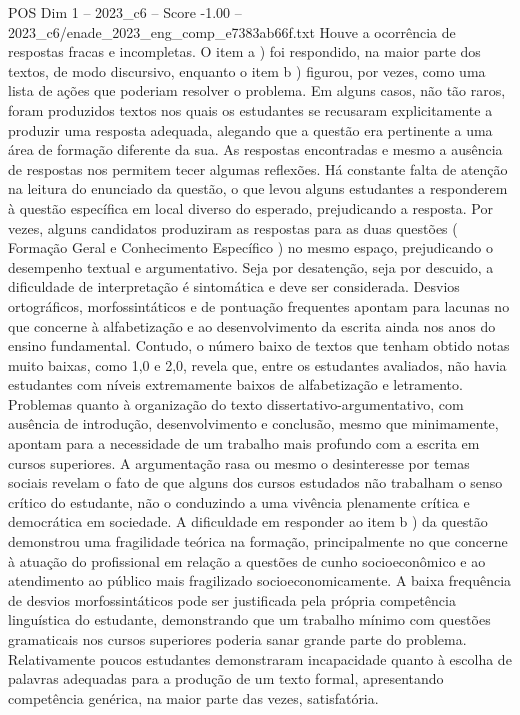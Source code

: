 \begin{textsample}{POS Dim 1 – 2023\_c6 – Score -1.00 – 2023\_c6/enade\_2023\_eng\_comp\_e7383ab66f.txt}
Houve a ocorrência de respostas fracas e incompletas.
O item a ) foi respondido, na maior parte dos textos, de modo discursivo, enquanto o item b ) figurou, por vezes, como uma lista de ações que poderiam resolver o problema.
Em alguns casos, não tão raros, foram produzidos textos nos quais os estudantes se recusaram explicitamente a produzir uma resposta adequada, alegando que a questão era pertinente a uma área de formação diferente da sua.
As respostas encontradas e mesmo a ausência de respostas nos permitem tecer algumas reflexões.
Há constante falta de atenção na leitura do enunciado da questão, o que levou alguns estudantes a responderem à questão específica em local diverso do esperado, prejudicando a resposta.
Por vezes, alguns candidatos produziram as respostas para as duas questões ( Formação Geral e Conhecimento Específico ) no mesmo espaço, prejudicando o desempenho textual e argumentativo.
Seja por desatenção, seja por descuido, a dificuldade de interpretação é sintomática e deve ser considerada.
Desvios ortográficos, morfossintáticos e de pontuação frequentes apontam para lacunas no que concerne à alfabetização e ao desenvolvimento da escrita ainda nos anos do ensino fundamental.
Contudo, o número baixo de textos que tenham obtido notas muito baixas, como 1,0 e 2,0, revela que, entre os estudantes avaliados, não havia estudantes com níveis extremamente baixos de alfabetização e letramento.
Problemas quanto à organização do texto dissertativo-argumentativo, com ausência de introdução, desenvolvimento e conclusão, mesmo que minimamente, apontam para a necessidade de um trabalho mais profundo com a escrita em cursos superiores.
A argumentação rasa ou mesmo o desinteresse por temas sociais revelam o fato de que alguns dos cursos estudados não trabalham o senso crítico do estudante, não o conduzindo a uma vivência plenamente crítica e democrática em sociedade.
A dificuldade em responder ao item b ) da questão demonstrou uma fragilidade teórica na formação, principalmente no que concerne à atuação do profissional em relação a questões de cunho socioeconômico e ao atendimento ao público mais fragilizado socioeconomicamente.
A baixa frequência de desvios morfossintáticos pode ser justificada pela própria competência linguística do estudante, demonstrando que um trabalho mínimo com questões gramaticais nos cursos superiores poderia sanar grande parte do problema.
Relativamente poucos estudantes demonstraram incapacidade quanto à escolha de palavras adequadas para a produção de um texto formal, apresentando competência genérica, na maior parte das vezes, satisfatória.

\end{textsample}
